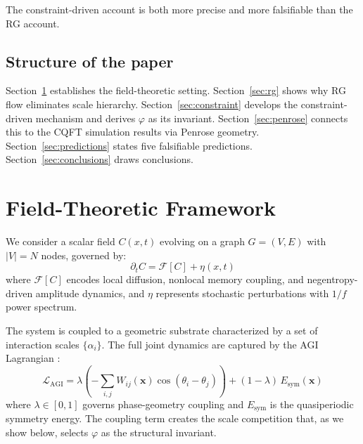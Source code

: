 \documentclass[11pt,a4paper]{article}
\theoremstyle{plain}
\theoremstyle{definition}
\newcommand{\phiGolden}{\varphi}
\begin{document}
The constraint-driven account is both more precise and more falsifiable
than the RG account.

\subsection{Structure of the paper}

Section~\ref{sec:framework} establishes the field-theoretic setting.
Section~\ref{sec:rg} shows why RG flow eliminates scale hierarchy.
Section~\ref{sec:constraint} develops the constraint-driven mechanism
and derives $\phiGolden$ as its invariant.
Section~\ref{sec:penrose} connects this to the CQFT simulation results
via Penrose geometry.
Section~\ref{sec:predictions} states five falsifiable predictions.
Section~\ref{sec:conclusions} draws conclusions.

\section{Field-Theoretic Framework}
\label{sec:framework}

We consider a scalar field $C(x,t)$ evolving on a graph $G = (V,E)$
with $|V| = N$ nodes, governed by:
\begin{equation}
\label{eq:field}
\partial_t C = \mathcal{F}[C] + \eta(x,t)
\end{equation}
where $\mathcal{F}[C]$ encodes local diffusion, nonlocal memory coupling,
and negentropy-driven amplitude dynamics, and $\eta$ represents stochastic
perturbations with $1/f$ power spectrum.

The system is coupled to a geometric substrate characterized by a set of
interaction scales $\{\alpha_i\}$. The full joint dynamics are captured
by the AGI Lagrangian \citep{solis2026cqft}:
\begin{equation}
\label{eq:lagrangian}
\mathcal{L}_{\text{AGI}} = \lambda\!\left(
  -\sum_{i,j} W_{ij}(\mathbf{x})\cos(\theta_i - \theta_j)
\right) + (1-\lambda)\,E_{\text{sym}}(\mathbf{x})
\end{equation}
where $\lambda \in [0,1]$ governs phase-geometry coupling and
$E_{\text{sym}}$ is the quasiperiodic symmetry energy. The coupling
term creates the scale competition that, as we show below, selects
$\phiGolden$ as the structural invariant.

\end{document}
